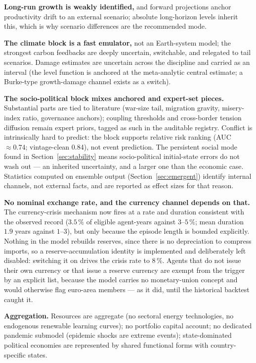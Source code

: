 \documentclass[a4paper,fleqn]{cas-sc}
\begin{document}
\textbf{Long-run growth is weakly identified,} and forward projections anchor productivity
drift to an external scenario; absolute long-horizon levels inherit this, which is why scenario
differences are the recommended mode.

\textbf{The climate block is a fast emulator,} not an Earth-system model; the strongest carbon
feedbacks are deeply uncertain, switchable, and relegated to tail scenarios. Damage estimates
are uncertain across the discipline and carried as an interval (the level function is anchored
at the meta-analytic central estimate; a Burke-type growth-damage channel exists as a switch).

\textbf{The socio-political block mixes anchored and expert-set pieces.} Substantial parts are
tied to literature (war-size tail, migration gravity, misery-index ratio, governance anchors);
coupling thresholds and cross-border tension diffusion remain expert priors, tagged as such in
the auditable registry. Conflict is intrinsically hard to predict: the block supports relative
risk ranking (AUC ${\approx}0.74$; vintage-clean 0.84), not event prediction. The persistent
social mode found in Section~\ref{sec:stability} means socio-political initial-state errors do
not wash out --- an inherited uncertainty, and a larger one than the economic case. Statistics
computed on ensemble output (Section~\ref{sec:emergent}) identify internal channels, not
external facts, and are reported as effect sizes for that reason.

\textbf{No nominal exchange rate, and the currency channel depends on that.} The currency-crisis
mechanism now fires at a rate and duration consistent with the observed record ($3.5\,\%$ of
eligible agent-years against $3$--$5\,\%$; mean duration $1.9$ years against $1$--$3$), but only
because the episode length is bounded explicitly. Nothing in the model rebuilds reserves, since
there is no depreciation to compress imports, so a reserve-accumulation identity is implemented
and deliberately left disabled: switching it on drives the crisis rate to $8\,\%$. Agents that do
not issue their own currency or that issue a reserve currency are exempt from the trigger by an
explicit list, because the model carries no monetary-union concept and would otherwise flag
euro-area members --- as it did, until the historical backtest caught it.

\textbf{Aggregation.} Resources are aggregate (no sectoral energy technologies, no endogenous
renewable learning curves); no portfolio capital account; no dedicated
pandemic submodel (epidemic shocks are extreme events); state-dominated political economies are
represented by shared functional forms with country-specific states.
\end{document}
